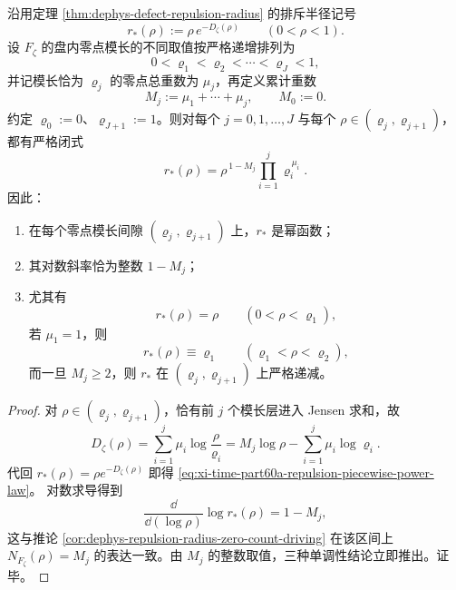 \begin{theorem}[排斥半径的分段幂律正规形与整数斜率层级]\label{thm:xi-time-part60a-repulsion-radius-piecewise-power-law}
沿用定理 \ref{thm:dephys-defect-repulsion-radius} 的排斥半径记号
\[
r_{\ast}(\rho):=\rho\,e^{-D_{\zeta}(\rho)}\qquad(0<\rho<1).
\]
设 \(F_{\zeta}\) 的盘内零点模长的不同取值按严格递增排列为
\[
0<\varrho_1<\varrho_2<\cdots<\varrho_J<1,
\]
并记模长恰为 \(\varrho_j\) 的零点总重数为 \(\mu_j\)，再定义累计重数
\[
M_j:=\mu_1+\cdots+\mu_j,
\qquad
M_0:=0.
\]
约定 \(\varrho_0:=0\)、\(\varrho_{J+1}:=1\)。则对每个
\(j=0,1,\dots,J\) 与每个 \(\rho\in(\varrho_j,\varrho_{j+1})\)，都有严格闭式
\begin{equation}\label{eq:xi-time-part60a-repulsion-piecewise-power-law}
\boxed{\;
r_{\ast}(\rho)=
\rho^{\,1-M_j}
\prod_{i=1}^{j}\varrho_i^{\,\mu_i}.\;}
\end{equation}
因此：
\begin{enumerate}
  \item 在每个零点模长间隙 \((\varrho_j,\varrho_{j+1})\) 上，\(r_{\ast}\) 是幂函数；
  \item 其对数斜率恰为整数 \(1-M_j\)；
  \item 尤其有
  \[
  r_{\ast}(\rho)=\rho\qquad(0<\rho<\varrho_1),
  \]
  若 \(\mu_1=1\)，则
  \[
  r_{\ast}(\rho)\equiv \varrho_1
  \qquad(\varrho_1<\rho<\varrho_2),
  \]
  而一旦 \(M_j\ge 2\)，则 \(r_{\ast}\) 在
  \((\varrho_j,\varrho_{j+1})\) 上严格递减。
\end{enumerate}
\end{theorem}
\begin{proof}
对 \(\rho\in(\varrho_j,\varrho_{j+1})\)，恰有前 \(j\) 个模长层进入 Jensen 求和，故
\[
D_{\zeta}(\rho)
=
\sum_{i=1}^{j}\mu_i\log\frac{\rho}{\varrho_i}
=
M_j\log\rho-\sum_{i=1}^{j}\mu_i\log\varrho_i.
\]
代回 \(r_{\ast}(\rho)=\rho e^{-D_{\zeta}(\rho)}\) 即得
\eqref{eq:xi-time-part60a-repulsion-piecewise-power-law}。
对数求导得到
\[
\frac{\dd}{\dd(\log\rho)}\log r_{\ast}(\rho)=1-M_j,
\]
这与推论 \ref{cor:dephys-repulsion-radius-zero-count-driving} 在该区间上
\(N_{F_{\zeta}}(\rho)=M_j\) 的表达一致。由 \(M_j\) 的整数取值，三种单调性结论立即推出。证毕。
\end{proof}

